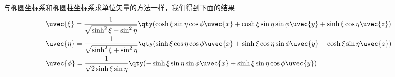 与椭圆坐标系和椭圆柱坐标系求单位矢量的方法一样，我们得到下面的结果
\begin{equation}
\begin{aligned}
&\uvec{\xi}=\frac{1}{\sqrt{\sinh^2\xi+\sin^2\eta}}\qty(\cosh\xi\sin\eta\cos\phi\uvec{x}+\cosh\xi\sin\eta\sin\phi\uvec{y}+\sinh\xi\cos\eta\uvec{z})\\
&\uvec{\eta}=\frac{1}{\sqrt{\sinh^2\xi+\sin^2\eta}}\qty(\sinh\xi\cos\eta\cos\phi\uvec{x}+\sinh\xi\cos\eta\sin\phi\uvec{y}-\cosh\xi\sin\eta\uvec{z})\\
&\uvec{\phi}=\frac{1}{\sqrt{2}\sinh\xi\sin\eta}\qty(-\sinh\xi\sin\eta\sin\phi\uvec{x}+\sinh\xi\sin\eta\cos\phi\uvec{y})
\end{aligned}
\end{equation}



